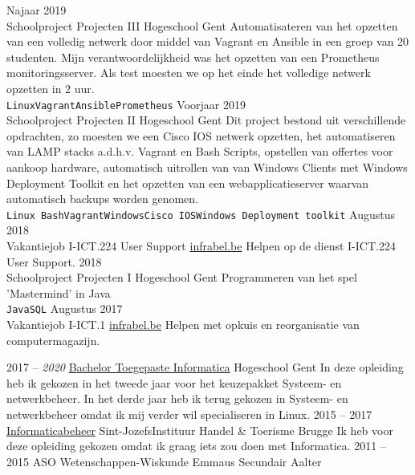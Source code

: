 \documentclass[9pt]{developercv} %
\begin{document}
\begin{entrylist}
	\entry
		{Najaar 2019\\\footnotesize{Schoolproject}}
		{Projecten III}
		{Hogeschool Gent}
		{Automatisateren van het opzetten van een volledig netwerk door middel van Vagrant en Ansible in een groep van 20 studenten. Mijn verantwoordelijkheid was het opzetten van een Prometheus monitoringsserver. Als test moesten we op het einde het volledige netwerk opzetten in 2 uur.
		\\ \texttt{Linux}\slashsep\texttt{Vagrant}\slashsep\texttt{Ansible}\slashsep\texttt{Prometheus}}
	\entry
		{Voorjaar 2019\\\footnotesize{Schoolproject}}
		{Projecten II}
		{Hogeschool Gent}
		{Dit project bestond uit verschillende opdrachten, zo moesten we een Cisco IOS netwerk opzetten, het automatiseren van LAMP stacks a.d.h.v. Vagrant en Bash Scripts, opstellen van offertes voor aankoop hardware, automatisch uitrollen van van Windows Clients met Windows Deployment Toolkit en het opzetten van een webapplicatieserver waarvan automatisch backups worden genomen.
		\\ \texttt{Linux Bash}\slashsep\texttt{Vagrant}\slashsep\texttt{Windows}\slashsep\texttt{Cisco IOS}\slashsep\texttt{Windows Deployment toolkit}}
	\entry
	    {Augustus 2018\\\footnotesize{Vakantiejob}}
	    {I-ICT.224 User Support}
	    {\href{https://www.infrabel.be/}{infrabel.be}}
	    {Helpen op de dienst I-ICT.224 User Support.}
	\entry
		{2018\\\footnotesize{Schoolproject}}
		{Projecten I}
		{Hogeschool Gent}
		{Programmeren van het spel 'Mastermind' in Java\\
		\texttt{Java}\slashsep\texttt{SQL}}
	\entry
	    {Augustus 2017\\\footnotesize{Vakantiejob}}
	    {I-ICT.1}
	    {\href{https://www.infrabel.be/}{infrabel.be}}
	    {Helpen met opkuis en reorganisatie van computermagazijn.}
\end{entrylist}



\begin{entrylist}
	\entry
		{2017 -- \textit{2020}}
		{\href{https://www.hogent.be/opleidingen/bachelors/toegepaste-informatica/}{Bachelor Toegepaste Informatica}}
		{Hogeschool Gent}
		{In deze opleiding heb ik gekozen in het tweede jaar voor het keuzepakket Systeem- en netwerkbeheer. In het derde jaar heb ik terug gekozen in Systeem- en netwerkbeheer omdat ik mij verder wil specialiseren in Linux. }
	\entry
		{2015 -- 2017}
		{\href{https://www.sintjozefbrugge.be/5e-en-6e-netwerken-en-it/}{Informaticabeheer}}
		{Sint-JozefsInstituur Handel \& Toerisme Brugge}
		{Ik heb voor deze opleiding gekozen omdat ik graag iets zou doen met Informatica.}
	\entry
		{2011 -- 2015}
		{ASO Wetenschappen-Wiskunde}
		{Emmaus Secundair Aalter}
		{ }
\end{entrylist}
\end{document}
